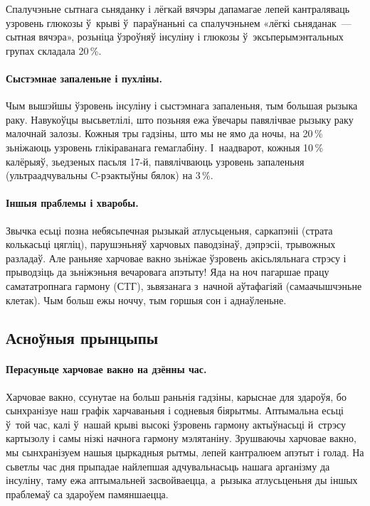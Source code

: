 Спалучэньне сытнага сьняданку і лёгкай вячэры дапамагае лепей кантраляваць узровень глюкозы ў~крыві ў~параўнаньні са спалучэньнем «лёгкі сьняданак~--- сытная вячэра», розьніца ўзроўняў інсуліну і глюкозы ў~эксьперымэнтальных групах складала 20\,\%.

\paragraph{Сыстэмнае запаленьне і пухліны.}
Чым вышэйшы ўзровень інсуліну і сыстэмнага запаленьня, тым большая рызыка раку. Навукоўцы высьветлілі, што позьняя ежа ўвечары павялічвае рызыку раку малочнай залозы. Кожныя тры гадзіны, што мы не ямо да ночы, на 20\,\% зьніжаюць узровень глікіраванага гемаглабіну. І~наадварот, кожныя 10\,\% калёрыяў, зьедзеных пасьля 17-й, павялічваюць узровень запаленьня (ультраадчувальны C-рэактыўны бялок) на 3\,\%.

\paragraph{Іншыя праблемы і хваробы.}
Звычка есьці позна небясьпечная рызыкай атлусьценьня, саркапэніі (страта колькасьці цягліц), парушэньняў харчовых паводзінаў, дэпрэсіі, трывожных разладаў. Але раньняе харчовае вакно зьніжае ўзровень акісьляльнага стрэсу і прыводзіць да зьніжэньня вечаровага апэтыту! Яда на ноч пагаршае працу самататропнага гармону (СTГ), зьвязанага з~начной аўтафагіяй (самаачышчэньне клетак). Чым больш ежы ноччу, тым горшыя сон і аднаўленьне.

\subsection{Асноўныя прынцыпы}

\paragraph{Перасуньце харчовае вакно на дзённы час.}
Харчовае вакно, ссунутае на больш раньнія гадзіны, карыснае для здароўя, бо сынхранізуе наш графік харчаваньня і содневыя біярытмы. Аптымальна есьці ў~той час, калі ў~нашай крыві высокі ўзровень гармону актыўнасьці й~стрэсу картызолу і самы нізкі начнога гармону мэлятаніну. Зрушваючы харчовае вакно, мы сынхранізуем нашыя цыркадныя рытмы, лепей кантралюем апэтыт і голад. На сьветлы час дня прыпадае найлепшая адчувальнасьць нашага арганізму да інсуліну, таму ежа аптымальней засвойваецца, а~рызыка атлусьценьня ды іншых праблемаў са здароўем памяншаецца.

